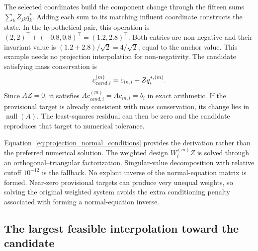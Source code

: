 The selected coordinates build the component change through the fifteen sums $\sum_kZ_{jk}q_k^*$. Adding each sum to its matching influent coordinate constructs the state. In the hypothetical pair, this operation is $(2,2)^\top+(-0.8,0.8)^\top=(1.2,2.8)^\top$. Both entries are non-negative and their invariant value is $(1.2+2.8)/\sqrt2=4/\sqrt2$, equal to the anchor value. This example needs no projection interpolation for non-negativity. The candidate satisfying mass conservation is
\begin{equation}
\equationname{Component candidate satisfying mass conservation}
c_{cand,i}^{(m)}=c_{in,i}+Zq_i^{*,(m)}.
\label{eq:projection_conservative_candidate}
\end{equation}
Since $AZ=0$, it satisfies $Ac_{cand,i}^{(m)}=Ac_{in,i}=b_i$ in exact arithmetic. If the provisional target is already consistent with mass conservation, its change lies in $\operatorname{null}(A)$. The least-squares residual can then be zero and the candidate reproduces that target to numerical tolerance.

Equation~\eqref{eq:projection_normal_conditions} provides the derivation rather than the preferred numerical solution. The weighted design $W_i^{(m)}Z$ is solved through an orthogonal--triangular factorization. Singular-value decomposition with relative cutoff $10^{-12}$ is the fallback. No explicit inverse of the normal-equation matrix is formed. Near-zero provisional targets can produce very unequal weights, so solving the original weighted system avoids the extra conditioning penalty associated with forming a normal-equation inverse.

\subsection{The largest feasible interpolation toward the candidate}

